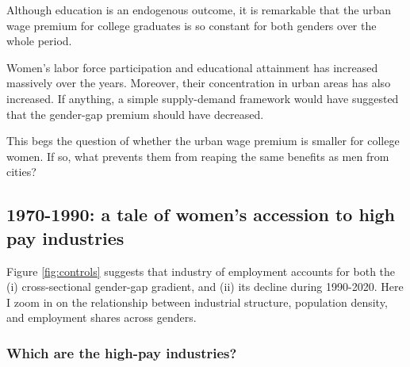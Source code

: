 Although education is an endogenous outcome, it is remarkable that the urban wage premium for college graduates is so constant for both genders over the whole period. 
\bitem
	\item Women's labor force participation and educational attainment has increased massively over the years. Moreover, their concentration in urban areas has also increased. If anything, a simple supply-demand framework would have suggested that the gender-gap premium should have decreased.
	\item This begs the question of whether the urban wage premium is smaller for college women. If so, what prevents them from reaping the same benefits as men from cities?
\eitem 



\subsection{1970-1990: a tale of women's accession to high pay industries}

Figure \ref{fig:controls} suggests that industry of employment accounts for both the (i) cross-sectional gender-gap gradient, and (ii) its decline during 1990-2020. Here I zoom in on the relationship between industrial structure, population density, and employment shares across genders.

\subsubsection{Which are the high-pay industries?}




